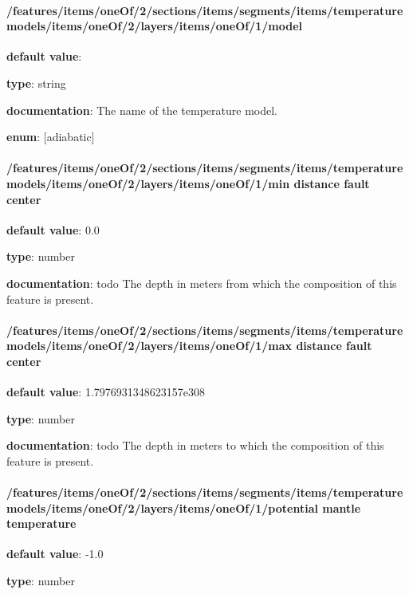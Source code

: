 \paragraph{/features/items/oneOf/2/sections/items/segments/items/temperature models/items/oneOf/2/layers/items/oneOf/1/model} \begin{itemized}
\item {\bf default value}: 
\item {\bf type}: string
\item {\bf documentation}: The name of the temperature model.
\item {\bf enum}: [adiabatic]\end{itemized}\paragraph{/features/items/oneOf/2/sections/items/segments/items/temperature models/items/oneOf/2/layers/items/oneOf/1/min distance fault center} \begin{itemized}
\item {\bf default value}: 0.0
\item {\bf type}: number
\item {\bf documentation}: todo The depth in meters from which the composition of this feature is present.
\end{itemized}\paragraph{/features/items/oneOf/2/sections/items/segments/items/temperature models/items/oneOf/2/layers/items/oneOf/1/max distance fault center} \begin{itemized}
\item {\bf default value}: 1.7976931348623157e308
\item {\bf type}: number
\item {\bf documentation}: todo The depth in meters to which the composition of this feature is present.
\end{itemized}\paragraph{/features/items/oneOf/2/sections/items/segments/items/temperature models/items/oneOf/2/layers/items/oneOf/1/potential mantle temperature} \begin{itemized}
\item {\bf default value}: -1.0
\item {\bf type}: number

\end{itemized}

